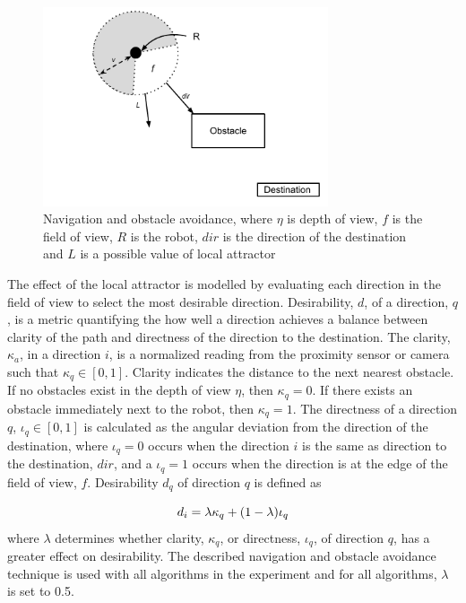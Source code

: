 \begin{figure}
	\centering
	\includegraphics[width=0.75\textwidth]{chapters/chapter5/figures/ObstacleAvoidance.pdf}
	\caption{Navigation and obstacle avoidance, where $\eta$ is depth of view, $f$ is the field of view, $R$ is the robot, $dir$ is the direction of the destination and $L$ is a possible value of local attractor}
	\label{fig:obstacleavoidance}
\end{figure}

The effect of the local attractor is modelled by evaluating each direction in the field of view to select the most desirable direction. Desirability, $d$, of a direction, $q$, is a metric quantifying the how well a direction achieves a balance between clarity of the path and directness of the direction to the destination. The clarity, $\kappa_a$, in a direction $i$, is a normalized reading from the proximity sensor or camera such that $\kappa_q\in[0,1]$. Clarity indicates the distance to the next nearest obstacle. If no obstacles exist in the depth of view $\eta$, then  $\kappa_q=0$. If there exists an obstacle immediately next to the robot, then $\kappa_q=1$. The directness of a direction $q$, $\iota_q\in[0,1]$ is calculated as the angular deviation from the direction of the destination, where $\iota_q=0$ occurs when the direction $i$ is the same as direction to the destination, $dir$, and a $\iota_q=1$ occurs when the direction is at the edge of the field of view, $f$. Desirability $d_q$ of direction $q$ is defined as

\begin{equation}
	d_i= \lambda \kappa_q + (1 - \lambda)\iota_q \\
	\label{eq:1}
\end{equation} where $\lambda$ determines whether clarity, $\kappa_q$, or directness, $\iota_q$, of direction $q$, has a greater effect on desirability. The described navigation and obstacle avoidance technique is used with all algorithms in the experiment and for all algorithms, $\lambda$ is set to 0.5.




